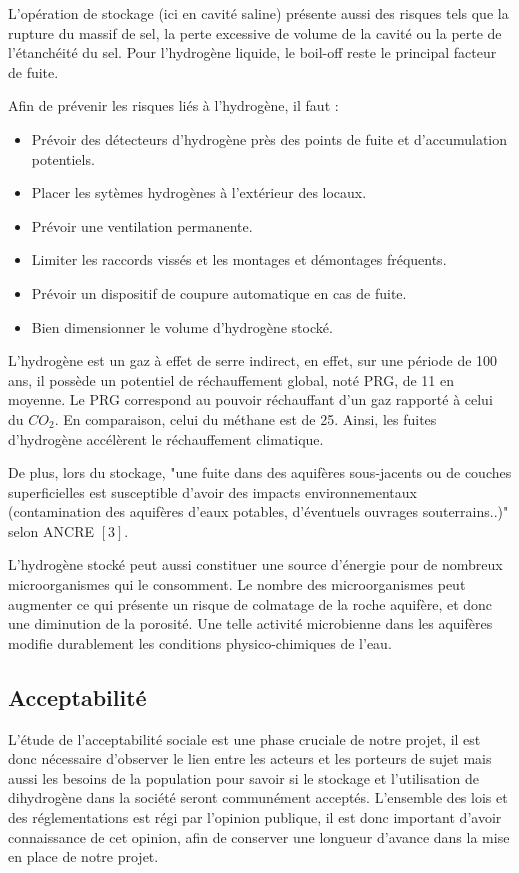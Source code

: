 \documentclass[11pt,french,a4paper]{article}
\begin{document}
L'opération de stockage (ici en cavité saline) présente aussi des risques tels que la rupture du massif de sel, la perte excessive de volume de la cavité ou la perte de l'étanchéité du sel. Pour l'hydrogène liquide, le boil-off reste le principal facteur de fuite. \cite{ADEME_2022}

Afin de prévenir les risques liés à l'hydrogène, il faut :
\begin{itemize}
\item Prévoir des détecteurs d'hydrogène près des points de fuite et d'accumulation potentiels.
\item Placer les sytèmes hydrogènes à l'extérieur des locaux.
\item Prévoir une ventilation permanente.
\item Limiter les raccords vissés et les montages et démontages fréquents.
\item Prévoir un dispositif de coupure automatique en cas de fuite.
\item Bien dimensionner le volume d'hydrogène stocké.
\end{itemize}

L'hydrogène est un gaz à effet de serre indirect, en effet, sur une période de 100 ans, il possède un potentiel de réchauffement global, noté PRG, de 11 en moyenne. Le PRG correspond au pouvoir réchauffant d'un gaz rapporté à celui du $CO_2$. En comparaison, celui du méthane est de 25. Ainsi, les fuites d'hydrogène accélèrent le réchauffement climatique.

De plus, lors du stockage, "une fuite dans des aquifères sous-jacents ou de couches superficielles est susceptible d'avoir des impacts environnementaux (contamination des aquifères d'eaux potables, d'éventuels ouvrages souterrains..)" selon ANCRE $[3]$.

L'hydrogène stocké peut aussi constituer une source d'énergie pour de nombreux microorganismes qui le consomment. Le nombre des microorganismes peut augmenter ce qui présente un risque de colmatage de la roche aquifère, et donc une diminution de la porosité. Une telle activité microbienne dans les aquifères modifie durablement les conditions physico-chimiques de l'eau.\\



\subsection{Acceptabilité}
L’étude de l’acceptabilité sociale est une phase cruciale de notre projet, il est donc nécessaire d’observer le lien entre les acteurs et les porteurs de sujet mais aussi les besoins de la population pour savoir si le stockage et l’utilisation de dihydrogène dans la société seront communément acceptés. L’ensemble des lois et des réglementations est régi par l’opinion publique, il est donc important d’avoir connaissance de cet opinion, afin de conserver une longueur d’avance dans la mise en place de notre projet.
\end{document}
